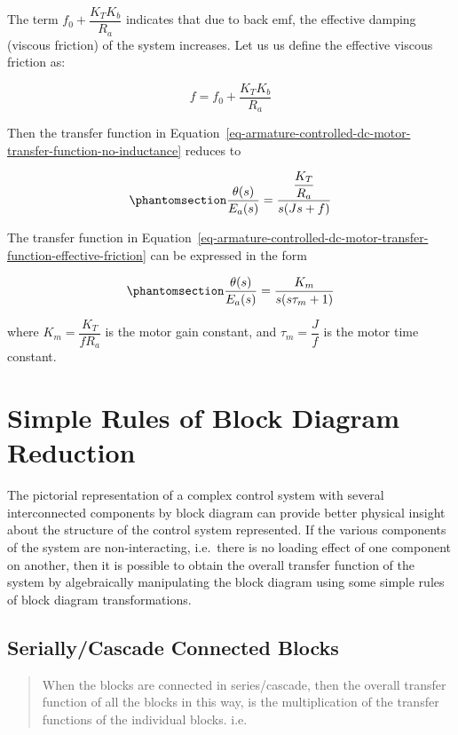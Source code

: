 \documentclass[
  14pt,
  a4paper,
  oneside,
  open=any,
  a4paper,
  14pt]{report}
\begin{document}
The term \(f_0 + \dfrac{K_T K_b}{R_a}\) indicates that due to back emf,
the effective damping (viscous friction) of the system increases. Let us
us define the effective viscous friction as:

\[
    f = f_0 + \dfrac{K_T K_b}{R_a}
\]

Then the transfer function in
Equation~\ref{eq-armature-controlled-dc-motor-transfer-function-no-inductance}
reduces to

\begin{equation}\phantomsection\label{eq-armature-controlled-dc-motor-transfer-function-effective-friction}{
    \dfrac{\theta(s)}{E_a(s)} = \dfrac{\dfrac{K_T}{R_a}}{s(Js + f)}
}\end{equation}

The transfer function in
Equation~\ref{eq-armature-controlled-dc-motor-transfer-function-effective-friction}
can be expressed in the form

\begin{equation}\phantomsection\label{eq-armature-controlled-dc-motor-transfer-function-standard}{
    \dfrac{\theta(s)}{E_a(s)} = \dfrac{K_m}{s(s\tau_m + 1)}
}\end{equation}

where \(K_m = \dfrac{K_T}{f R_a}\) is the motor gain constant, and
\(\tau_m = \dfrac{J}{f}\) is the motor time constant.

\section{Simple Rules of Block Diagram
Reduction}\label{simple-rules-of-block-diagram-reduction}

The pictorial representation of a complex control system with several
interconnected components by block diagram can provide better physical
insight about the structure of the control system represented. If the
various components of the system are non-interacting, i.e.~there is no
loading effect of one component on another, then it is possible to
obtain the overall transfer function of the system by algebraically
manipulating the block diagram using some simple rules of block diagram
transformations.

\subsection{Serially/Cascade Connected
Blocks}\label{seriallycascade-connected-blocks}

\begin{quote}
When the blocks are connected in series/cascade, then the overall
transfer function of all the blocks in this way, is the multiplication
of the transfer functions of the individual blocks. i.e.
\end{quote}
\end{document}
